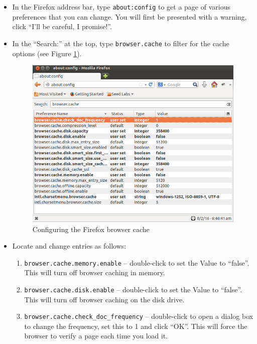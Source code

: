 \begin{itemize} 
\item In the Firefox address bar, type {\tt about:config} to get a page of various preferences that you can change.  You will first be presented with a warning, click ``I'll be careful, I promise!''.  
\item In the ``Search:''  at the top, type {\tt browser.cache} to filter for the cache options (see Figure \ref{fig:browsercache}).  
\begin{figure}[h]
    \centering
    \includegraphics*[width=.9\textwidth]{Figs/Firefox-cache.png}
    \caption{Configuring the Firefox browser cache}
    \label{fig:browsercache}
\end{figure}\item Locate and change entries as follows:

\begin{enumerate}
\item {\tt browser.cache.memory.enable} -- double-click to set the Value to ``false''.  This will turn off browser caching in memory.
\item {\tt browser.cache.disk.enable} -- double-click to set the Value to ``false''.  This will turn off browser caching on the disk drive.
\item {\tt browser.cache.check\_doc\_frequency} -- double-click to open a dialog box to change the frequency, set this to 1 and click ``OK''.  This will force the browser to verify a page each time you load it.
\end{enumerate}
\end{itemize}



